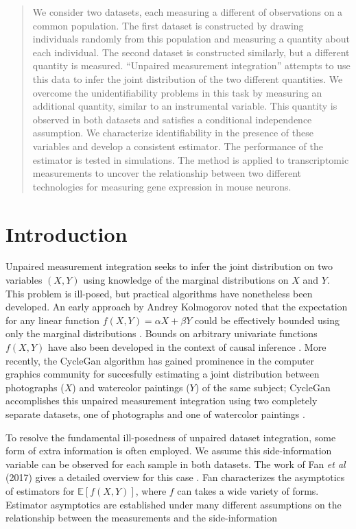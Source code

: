 \documentclass{article}
\theoremstyle{definition}
\begin{document}
\begin{abstract}
We consider two datasets, each measuring a different of observations on a common population.  The first dataset is constructed by drawing individuals randomly from this population and measuring a quantity about each individual.   The second dataset is constructed similarly, but a different quantity is measured.  ``Unpaired measurement integration'' attempts to use this data to infer the joint distribution of the two different quantities.  We overcome the unidentifiability problems in this task by measuring an additional quantity, similar to an instrumental variable.  This quantity is observed in both datasets and satisfies a conditional independence assumption.  We characterize identifiability in the presence of these variables and develop a consistent estimator.  The performance of the estimator is tested in simulations.  The method is applied to transcriptomic measurements to uncover the relationship between two different technologies for measuring gene expression in mouse neurons.
\end{abstract}

\section{Introduction}

Unpaired measurement integration seeks to infer the joint distribution on two variables $(X,Y)$ using knowledge of the marginal distributions on $X$ and $Y$.  This problem is ill-posed, but practical algorithms have nonetheless been developed.  An early approach by Andrey Kolmogorov noted that the expectation for any linear function $f(X,Y)=\alpha X+\beta Y$ could be effectively bounded using only the marginal distributions \cite{makarov1982estimates}.  Bounds on arbitrary univariate functions $f(X,Y)$ have also been developed in the context of causal inference \cite{balke1994counterfactual,FanYan2017}.  More recently, the CycleGan algorithm has gained prominence in the computer graphics community for succesfully estimating a joint distribution between photographs ($X$) and watercolor paintings ($Y$) of the same subject; CycleGan accomplishes this unpaired measurement integration using two completely separate datasets, one of photographs and one of watercolor paintings \cite{zhu2017unpaired}.

To resolve the fundamental ill-posedness of unpaired dataset integration, some form of extra information is often employed.  We assume this side-information variable can be observed for each sample in both datasets.  The work of Fan \emph{et al} (2017) gives a detailed overview for this case \cite{FanYan2017}.  Fan characterizes the asymptotics of estimators for $\mathbb{E}[f(X,Y)]$, where $f$ can takes a wide variety of forms.  Estimator asymptotics are established under many different assumptions on the relationship between the measurements and the side-information
\end{document}

